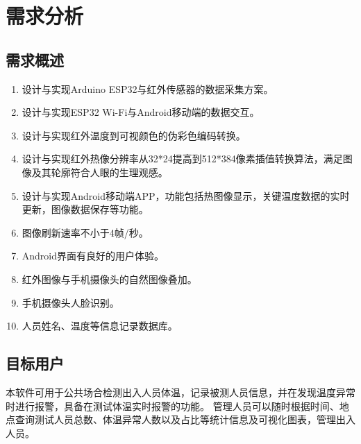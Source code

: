 
\chapter{需求分析}

\section{需求概述}
\begin{enumerate}
\item 设计与实现Arduino ESP32与红外传感器的数据采集方案。
\item 设计与实现ESP32 Wi-Fi与Android移动端的数据交互。
\item 设计与实现红外温度到可视颜色的伪彩色编码转换。
\item 设计与实现红外热像分辨率从32*24提高到512*384像素插值转换算法，满足图像及其轮廓符合人眼的生理观感。
\item 设计与实现Android移动端APP，功能包括热图像显示，关键温度数据的实时更新，图像数据保存等功能。
\item 图像刷新速率不小于4帧/秒。
\item Android界面有良好的用户体验。
\item 红外图像与手机摄像头的自然图像叠加。
\item 手机摄像头人脸识别。
\item 人员姓名、温度等信息记录数据库。
\end{enumerate}

\section{目标用户}
本软件可用于公共场合检测出入人员体温，记录被测人员信息，并在发现温度异常时进行报警，具备在测试体温实时报警的功能。
管理人员可以随时根据时间、地点查询测试人员总数、体温异常人数以及占比等统计信息及可视化图表，管理出入人员。



